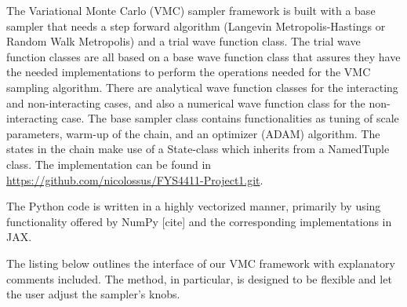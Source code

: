 The Variational Monte Carlo (VMC) sampler framework is built with a base sampler that needs a step forward algorithm (Langevin Metropolis-Hastings or Random Walk Metropolis) and a trial wave function class. The trial wave function classes are all based on a base wave function class that assures they have the needed implementations to perform the operations needed for the VMC sampling algorithm. There are analytical wave function classes for the interacting and non-interacting cases, and also a numerical wave function class for the non-interacting case. The base sampler class contains functionalities as tuning of scale parameters, warm-up of the chain, and an optimizer (ADAM) algorithm. The states in the chain make use of a State-class which inherits from a NamedTuple class. The implementation can be found in \url{https://github.com/nicolossus/FYS4411-Project1.git}. %

The Python code is written in a highly vectorized manner, primarily by using functionality offered by NumPy [cite] and the corresponding implementations in JAX.

The listing below outlines the interface of our VMC framework with explanatory comments included. The  method, in particular, is designed to be flexible and let the user adjust the sampler's knobs. 

